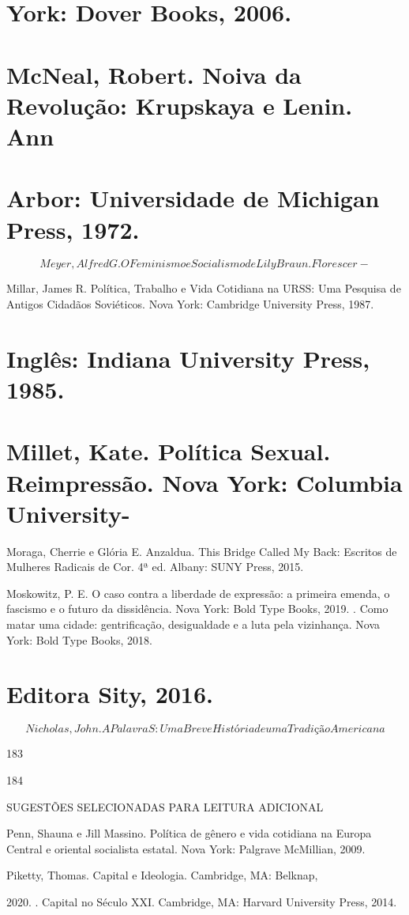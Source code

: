 \section{York: Dover Books, 2006.}
 \par 
\section{McNeal, Robert. Noiva da Revolução: Krupskaya e Lenin. Ann}
 \par 
\section{Arbor: Universidade de Michigan Press, 1972.}
 \par 
\[Meyer, Alfred G. O Feminismo e Socialismo de Lily Braun. Florescer-\]
 \par 
Millar, James R. Política, Trabalho e Vida Cotidiana na URSS: Uma Pesquisa de Antigos Cidadãos Soviéticos. Nova York: Cambridge University Press, 1987.
 \par 
\section{Inglês: Indiana University Press, 1985.}
 \par 
\section{Millet, Kate. Política Sexual. Reimpressão. Nova York: Columbia University-}
 \par 
Moraga, Cherrie e Glória E. Anzaldua. This Bridge Called My Back: Escritos de Mulheres Radicais de Cor. 4ª ed. Albany: SUNY Press, 2015.
 \par 
Moskowitz, P. E. O caso contra a liberdade de expressão: a primeira emenda, o fascismo e o futuro da dissidência. Nova York: Bold Type Books, 2019. . Como matar uma cidade: gentrificação, desigualdade e a luta pela vizinhança. Nova York: Bold Type Books, 2018.
 \par 
\section{Editora Sity, 2016.}
 \par 
\[Nicholas, John. A Palavra S: Uma Breve História de uma Tradição Americana\]
 \par 
183
 \par 
184
 \par 
SUGESTÕES SELECIONADAS PARA LEITURA ADICIONAL
 \par 
Penn, Shauna e Jill Massino. Política de gênero e vida cotidiana na Europa Central e oriental socialista estatal. Nova York: Palgrave McMillian, 2009.
 \par 
Piketty, Thomas. Capital e Ideologia. Cambridge, MA: Belknap,
 \par 
2020. . Capital no Século XXI. Cambridge, MA: Harvard University Press, 2014.
 \par 
